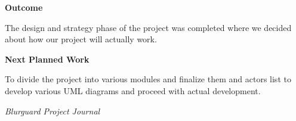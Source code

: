 \documentclass[12pt,a4paper]{article}
\begin{document}
\vspace{8pt}


\textbf{\large Outcome}

\vspace{4pt}

The design and strategy phase of the project was completed where we decided about how our project will actually work.

\vspace{8pt}


\textbf{\large Next Planned Work}

\vspace{4pt}

To divide the project into various modules and finalize them and actors list to develop various UML diagrams and proceed with actual development. 

\vfill


\begin{flushright}
    \textit{Blurguard Project Journal}
\end{flushright}
\end{document}
